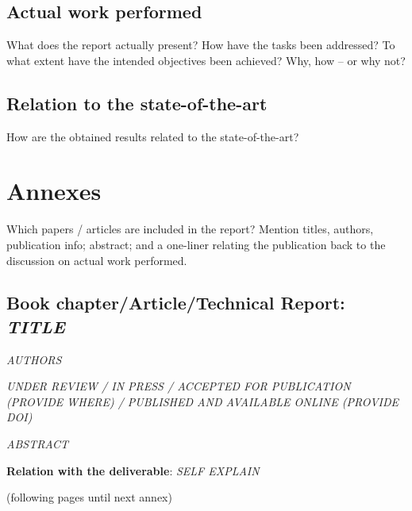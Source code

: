\documentclass[a4paper,11pt,pdf]{pacmanreport}
\begin{document}
\subsection{Actual work performed}

What does the report actually present? How have the tasks been addressed? To what extent have the intended objectives been achieved? Why, how -- or why not? 

\subsection{Relation to the state-of-the-art}

How are the obtained results related to the state-of-the-art? 




\newpage

\appendix
\section{Annexes}

Which papers / articles are included in the report? Mention titles, authors, publication info; abstract; and a one-liner relating the publication back to the discussion on actual work performed. 

\subsection{Book chapter/Article/Technical Report: \em TITLE}
\begin{description}
    \item[Authors] \em AUTHORS
    \item[Info] \em UNDER REVIEW / IN PRESS / ACCEPTED FOR PUBLICATION (PROVIDE WHERE) / PUBLISHED AND AVAILABLE ONLINE (PROVIDE DOI)
    \item[Abstract] \em ABSTRACT
    \item \textbf{Relation with the deliverable}: \em SELF EXPLAIN
    \item[Attachment] (following pages until next annex)
\end{description}
%
\end{document}
